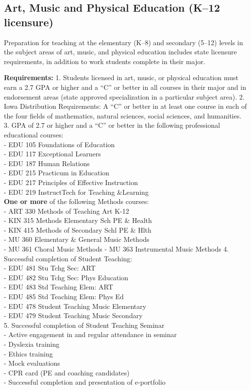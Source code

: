 \documentclass[
  letterpaper,
]{scrbook}
\begin{document}
\subsection{Art, Music and Physical Education (K--12
licensure)}\label{art-music-and-physical-education-k12-licensure}

Preparation for teaching at the elementary (K--8) and secondary (5--12)
levels in the subject areas of art, music, and physical education
includes state licensure requirements, in addition to work students
complete in their major.

\textbf{Requirements:} 1. Students licensed in art, music, or physical
education must earn a 2.7 GPA or higher and a ``C'' or better in all
courses in their major and in endorsement areas (state approved
specialization in a particular subject area). 2. Iowa Distribution
Requirements: A ``C'' or better in at least one course in each of the
four fields of mathematics, natural sciences, social sciences, and
humanities. 3. GPA of 2.7 or higher and a ``C'' or better in the
following professional educational courses:\\
- EDU 105 Foundations of Education\\
- EDU 117 Exceptional Learners\\
- EDU 187 Human Relations\\
- EDU 215 Practicum in Education\\
- EDU 217 Principles of Effective Instruction\\
- EDU 219 InstructTech for Teaching \&Learning\\
\textbf{One or more} of the following Methods courses:\\
- ART 330 Methods of Teaching Art K-12\\
- KIN 315 Methods Elementary Sch PE \& Health\\
- KIN 415 Methods of Secondary Schl PE \& Hlth\\
- MU 360 Elementary \& General Music Methods\\
- MU 361 Choral Music Methods - MU 363 Instrumental Music Methods 4.
Successful completion of Student Teaching:\\
- EDU 481 Stu Tchg Sec: ART\\
- EDU 482 Stu Tchg Sec: Phys Education\\
- EDU 483 Std Teaching Elem: ART\\
- EDU 485 Std Teaching Elem: Phys Ed\\
- EDU 478 Student Teaching Music Elementary\\
- EDU 479 Student Teaching Music Secondary\\
5. Successful completion of Student Teaching Seminar\\
- Active engagement in and regular attendance in seminar\\
- Dyslexia training\\
- Ethics training\\
- Mock evaluations\\
- CPR card (PE and coaching candidates)\\
- Successful completion and presentation of e-portfolio
\end{document}
